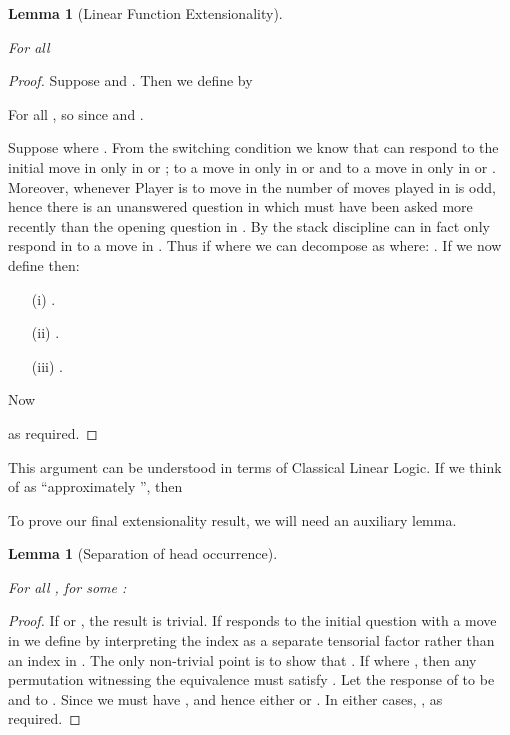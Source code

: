 \documentclass[11pt]{article}
\newtheorem{lemma}[theorem]{Lemma}
\begin{document}
\begin{lemma}[Linear Function Extensionality]\label{LFE}

For all 

\end{lemma}
\begin{proof}  Suppose  and
. Then we define  by

For all , so
 since  and
.

 Suppose  where
. From the switching
condition we know that  can respond to the initial move in
 only in  or ; to a move in 
only in  or  and to a move in  only in  or
. Moreover, whenever Player is to move in  the
number of moves played in  is odd, hence there is an unanswered
question in  which must have been asked more recently than the
opening question in . By the stack discipline
 can in fact only respond in  to a move in .  Thus
if  where  we can decompose 
as  where: .
If we now define  then:
\begin{itemize}
\item[(i)] .
\item[(ii)] .
\item[(iii)] .
\end{itemize}
Now

as required.
\end{proof}

This argument can be understood in terms of Classical Linear Logic. If
we think of  as ``approximately '', then

To prove our final extensionality result, we will need an auxiliary
lemma.

\begin{lemma}[Separation of head occurrence]\label{Soho}

For all , for some :

\end{lemma}
\begin{proof}If  or
, the result is trivial. If  responds
to the initial question  with a move  in  we define
 by interpreting the index  as a separate tensorial
factor rather than an index in . The only non-trivial point is
to show that . If  where , then any
permutation  witnessing the equivalence must satisfy
. Let the response of  to  be 
and to   . Since  we must have
, and hence either  or . In either cases, , as required.
\end{proof}
\end{document}

